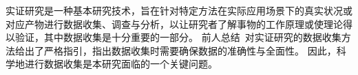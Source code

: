 实证研究是一种基本研究技术，旨在针对特定方法在实际应用场景下的真实状况或对应产物进行数据收集、调查与分析，以让研究者了解事物的工作原理或使理论得以验证，其中数据收集是十分重要的一部分。
前人总结~\cite{kitchenham2002preliminary}对实证研究的数据收集方法给出了严格指引，指出数据收集时需要确保数据的准确性与全面性。
因此，科学地进行数据收集是本研究面临的一个关键问题。

%
%
%
